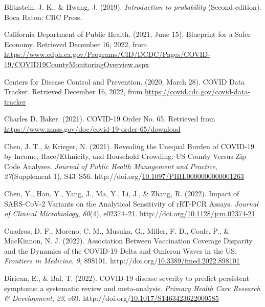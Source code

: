 \documentclass[12pt,twoside]{smiththesis}
\newlength{\cslhangindent}
\newenvironment{CSLReferences}[2] %
 {%
\setlength{\parindent}{0pt}
\ifodd #1 \everypar{\setlength{\hangindent}{\cslhangindent}}\ignorespaces\fi
\ifnum #2 > 0
\setlength{\parskip}{#2\baselineskip}
  \fi
}%
{}
\begin{document}
\hypertarget{refs}{}
\begin{CSLReferences}{1}{0}
\leavevmode{}%
Blitzstein, J. K., \& Hwang, J. (2019). \emph{Introduction to probability} (Second edition). Boca Raton: CRC Press.

\leavevmode{}%
California Department of Public Health. (2021, June 15). Blueprint for a Safer Economy. Retrieved December 16, 2022, from \url{https://www.cdph.ca.gov/Programs/CID/DCDC/Pages/COVID-19/COVID19CountyMonitoringOverview.aspx}

\leavevmode{}%
Centers for Disease Control and Prevention. (2020, March 28). COVID Data Tracker. Retrieved December 16, 2022, from \url{https://covid.cdc.gov/covid-data-tracker}

\leavevmode{}%
Charles D. Baker. (2021). COVID-19 Order No. 65. Retrieved from \url{https://www.mass.gov/doc/covid-19-order-65/download}

\leavevmode{}%
Chen, J. T., \& Krieger, N. (2021). Revealing the Unequal Burden of COVID-19 by Income, Race/Ethnicity, and Household Crowding: US County Versus Zip Code Analyses. \emph{Journal of Public Health Management and Practice}, \emph{27}(Supplement 1), S43--S56. http://doi.org/\href{https://doi.org/10.1097/PHH.0000000000001263}{10.1097/PHH.0000000000001263}

\leavevmode{}%
Chen, Y., Han, Y., Yang, J., Ma, Y., Li, J., \& Zhang, R. (2022). Impact of SARS-CoV-2 Variants on the Analytical Sensitivity of rRT-PCR Assays. \emph{Journal of Clinical Microbiology}, \emph{60}(4), e02374--21. http://doi.org/\href{https://doi.org/10.1128/jcm.02374-21}{10.1128/jcm.02374-21}

\leavevmode{}%
Cuadros, D. F., Moreno, C. M., Musuka, G., Miller, F. D., Coule, P., \& MacKinnon, N. J. (2022). Association Between Vaccination Coverage Disparity and the Dynamics of the COVID-19 Delta and Omicron Waves in the US. \emph{Frontiers in Medicine}, \emph{9}, 898101. http://doi.org/\href{https://doi.org/10.3389/fmed.2022.898101}{10.3389/fmed.2022.898101}

\leavevmode{}%
Dirican, E., \& Bal, T. (2022). COVID-19 disease severity to predict persistent symptoms: a systematic review and meta-analysis. \emph{Primary Health Care Research \& Development}, \emph{23}, e69. http://doi.org/\href{https://doi.org/10.1017/S1463423622000585}{10.1017/S1463423622000585}


\end{CSLReferences}
\end{document}
